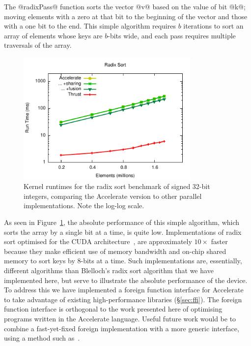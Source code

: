 The @radixPass@ function sorts the vector @v@ based on the value of
bit @k@; moving elements with a zero at that bit to the beginning of the
vector and those with a one bit to the end. This simple algorithm requires
$b$ iterations to sort an array of elements whose keys are $b$-bits wide, and
each pass requires multiple traversals of the array.

\begin{figure}
    \begin{center}
        \includegraphics[width=0.8\textwidth]{images/sec-6/radixsort/radixsort}
    \end{center}
    \caption[Radix sort kernel benchmarks]{Kernel runtimes for the radix sort benchmark
        of signed 32-bit integers, comparing the Accelerate version to other
        parallel implementations. Note the log-log scale.}
    \label{fig:radixsort}
\end{figure}

As seen in Figure~\ref{fig:radixsort}, the absolute performance of this simple
algorithm, which sorts the array by a single bit at a time, is quite low.
Implementations of radix sort optimised for the CUDA
architecture~\cite{Satish:2009kx,Merrill:2011bz,ThrustAParallelT:ub}, are
approximately $10\times$ faster because they make efficient use of memory
bandwidth and on-chip shared memory to sort keys by 8-bits at a time. Such
implementations are, essentially, different algorithms than Blelloch's radix
sort algorithm that we have implemented here, but serve to illustrate the
absolute performance of the device. To address this we have implemented a
foreign function interface for Accelerate to take advantage of existing
high-performance libraries (\S\ref{sec:ffi}). The foreign function interface is
orthogonal to the work presented here of optimising programs written in the
Accelerate language. Useful future work would be to combine a fast-yet-fixed
foreign implementation with a more generic interface, using a method such
as~\cite{Henglein:2013dd}.


